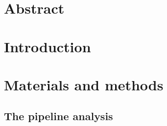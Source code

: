 \documentclass{article}
\begin{document}
\section{Abstract}

\section{Introduction}

\section{Materials and methods}

\subsection{The pipeline analysis}
\end{document}
